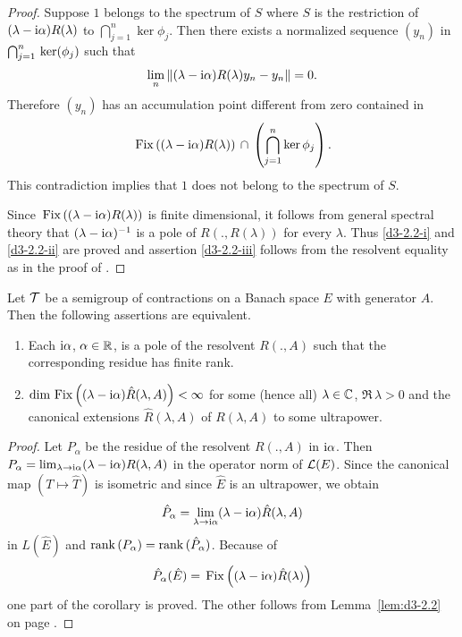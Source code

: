 \begin{proof}
Suppose $1$ belongs to the spectrum of $S$ where $S$ is the restriction of 
$(\lambda-\mathrm{i}\alpha)R(\lambda)$ to $\bigcap_{j=1}^{n} \ker\phi_{j}$.
Then there exists a normalized sequence $(y_{n})$ in 
$\bigcap_{j=1}^{n} \mathop{}\mathrm{ker}(\phi_{j})$ such that
\[
\lim_{n} \|(\lambda - \mathrm{i}\alpha)R(\lambda)y_{n} - y_{n}\| = 0 .
\]
Therefore $(y_{n})$ has an accumulation point different from zero contained in
\[
\mathop{}\mathrm{Fix}\left((\lambda - \mathrm{i}\alpha)R(\lambda)\right) \, \cap \,\left( \bigcap_{j=1}^{n} \ker\phi_{j} \right) .
\]
This contradiction implies that $1$ does not belong to the spectrum of $S$.

Since $\mathop{}\mathrm{Fix}\left((\lambda - \mathrm{i}\alpha)R(\lambda)\right)$ is finite dimensional, it follows from general spectral theory that $(\lambda - \mathrm{i}\alpha)^{-1}$ is a pole of $R(.,R(\lambda))$ for every $\lambda$.
Thus \ref{d3-2.2-i} and \ref{d3-2.2-ii} are proved and assertion \ref{d3-2.2-iii} follows from the resolvent equality as in the proof of \citet[Proposition 1.2]{greiner:1981}.
\end{proof}
\begin{proposition}\label{prop:d3-2.3}
Let $\mathcal{T}$ be a semigroup of contractions on a Banach space $E$ with generator $A$.
Then the following assertions are equivalent.
\begin{enumerate}[\upshape (a)]

\item
Each $\mathrm{i}\alpha$, $\alpha \in \mathbb{R}$, is a pole of the resolvent $R(.,A)$ such that the corresponding residue has finite rank.

\item
$\dim \mathop{}\mathrm{Fix}\left((\lambda - \mathrm{i}\alpha)\hat{R}(\lambda,A)\right) < \infty$ for some (hence all) $\lambda \in \mathbb{C}$, $\Re\,\lambda > 0$ and the canonical extensions $\hat{R}(\lambda,A)$ of $R(\lambda,A)$ to some ultrapower.

\end{enumerate}
\end{proposition}
\begin{proof}
Let $P_{\alpha}$ be the residue of the resolvent $R(.,A)$ in $\mathrm{i}\alpha$.
Then $P_{\alpha} = \lim_{\lambda \to \mathrm{i}\alpha}(\lambda - \mathrm{i}\alpha)R(\lambda,A)$ in the operator norm of $\mathcal{L}(E)$.
Since the canonical map $(T \mapsto \hat{T})$ is isometric and since $\hat{E}$ is an ultrapower, we obtain
\[
\hat{P}_{\alpha} = \lim_{\lambda \to \mathrm{i}\alpha}(\lambda - \mathrm{i}\alpha)\hat{R}(\lambda,A)
\]
in $L(\hat{E})$ and $\mathop{}\!\mathrm{rank}\,(P_{\alpha}) = \mathop{}\!\mathrm{rank}\,(\hat{P}_{\alpha})$.
Because of
\[
\hat{P}_{\alpha}(\hat{E}) = \mathop{}\mathrm{Fix}\left((\lambda-\mathrm{i}\alpha)\hat{R}(\lambda)\right)
\]
one part of the corollary is proved. The other follows from Lemma~\ref{lem:d3-2.2} on page \pageref{lem:d3-2.2}.
\end{proof}
